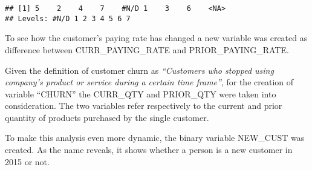 \documentclass[]{article}
\newenvironment{Shaded}{\begin{snugshade}}{\end{snugshade}}
\newcommand{\KeywordTok}[1]{\textcolor[rgb]{0.13,0.29,0.53}{\textbf{#1}}}
\newcommand{\DecValTok}[1]{\textcolor[rgb]{0.00,0.00,0.81}{#1}}
\newcommand{\StringTok}[1]{\textcolor[rgb]{0.31,0.60,0.02}{#1}}
\newcommand{\OtherTok}[1]{\textcolor[rgb]{0.56,0.35,0.01}{#1}}
\newcommand{\OperatorTok}[1]{\textcolor[rgb]{0.81,0.36,0.00}{\textbf{#1}}}
\newcommand{\NormalTok}[1]{#1}
\begin{document}
\begin{verbatim}
## [1] 5    2    4    7    #N/D 1    3    6    <NA>
## Levels: #N/D 1 2 3 4 5 6 7
\end{verbatim}

\begin{Shaded}
\end{Shaded}

To see how the customer's paying rate has changed a new variable was
created as difference between CURR\_PAYING\_RATE and
PRIOR\_PAYING\_RATE.

Given the definition of customer churn as \emph{``Customers who stopped
using company's product or service during a certain time frame''}, for
the creation of variable ``CHURN'' the CURR\_QTY and PRIOR\_QTY were
taken into consideration. The two variables refer respectively to the
current and prior quantity of products purchased by the single customer.

\begin{Shaded}
\end{Shaded}

To make this analysis even more dynamic, the binary variable NEW\_CUST
was created. As the name reveals, it shows whether a person is a new
customer in 2015 or not.

\begin{Shaded}
\end{Shaded}
\end{document}
